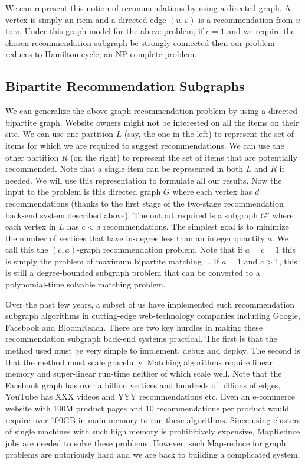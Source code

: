 We can represent this notion of recommendations by using a directed graph. A
vertex is simply an item and a directed edge $(u, v)$ is a recommendation from
$u$ to $v$. Under this graph model for the above problem, if $c=1$ and we
require the chosen recommendation subgraph be strongly connected then our
problem reduces to Hamilton cycle, an NP-complete problem. \vs

\subsection{Bipartite Recommendation Subgraphs}

We can generalize the above graph recommendation problem by using a directed
bipartite graph. Website owners might not be interested on all the items on
their site. We can use one partition $L$ (say, the one in the left) to represent
the set of items for which we are required  to suggest recommendations. We can
use the other partition $R$ (on the right) to represent the set of items that
are potentially recommended. Note that a single item can be represented in both
$L$ and $R$ if needed. We will use this representation to formulate all our
results. Now the input to the problem is this directed graph $G$ where each
vertex has $d$ recommendations (thanks to the first stage of the two-stage
recommendation back-end system described above). The output required is a
subgraph $G'$ where each vertex in $L$ has $c < d$ recommendations. The simplest
goal is to minimize the number of vertices that have in-degree less than an
integer quantity $a$. We call this the $(c, a)$-graph recommendation problem.
Note that if $a=c=1$ this is simply the problem of maximum bipartite matching
~\cite{LovaszPlummer}. If $a=1$ and $c > 1$, this is still a degree-bounded
subgraph problem that can be converted to a polynomial-time solvable matching
problem. \vs

Over the past few years, a subset of us have implemented such recommendation
subgraph algorithms in cutting-edge web-technology companies including Google,
Facebook and BloomReach. There are two key hurdles in making these
recommendation subgraph back-end systems practical. The first is that the method
used must be very simple to implement, debug and deploy. The second is that the
method must scale gracefully.  Matching algorithms require linear memory and
super-linear run-time neither of which scale well. Note that the Facebook graph
has over a billion vertices\cite{} and hundreds of billions of edges\cite{},
YouTube has XXX videos and YYY recommendations\cite{} etc. Even an e-commerce
website with 100M product pages and 10 recommendations per product would require
over 100GB in main memory to run these algorithms. Since using clusters of
single machines with such high memory is prohibitively expensive, MapReduce
\cite{} jobs are needed to solve these problems. However, such Map-reduce for
graph problems are notoriously hard and we are back to building a complicated
system. \vs

